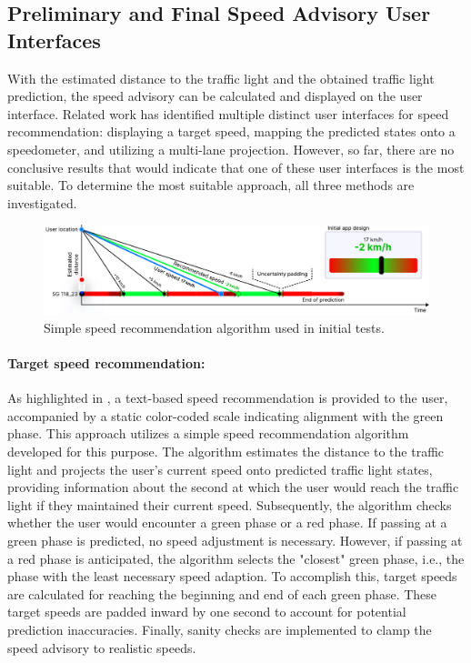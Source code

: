 \subsection{Preliminary and Final Speed Advisory User Interfaces}

With the estimated distance to the traffic light and the obtained traffic light prediction, the speed advisory can be calculated and displayed on the user interface. Related work has identified multiple distinct user interfaces for speed recommendation: displaying a target speed, mapping the predicted states onto a speedometer, and utilizing a multi-lane projection. However, so far, there are no conclusive results that would indicate that one of these user interfaces is the most suitable. To determine the most suitable approach, all three methods are investigated.

\begin{figure}[htbp]
\centering
\includegraphics[width=\linewidth]{images/graph-based-speed-recommendation.pdf}
\caption{Simple speed recommendation algorithm used in initial tests.}
\label{fig:graph-based-speed-recommendation}
\end{figure}

\paragraph{Target speed recommendation:} As highlighted in , a text-based speed recommendation is provided to the user, accompanied by a static color-coded scale indicating alignment with the green phase. This approach utilizes a simple speed recommendation algorithm developed for this purpose. The algorithm estimates the distance to the traffic light and projects the user's current speed onto predicted traffic light states, providing information about the second at which the user would reach the traffic light if they maintained their current speed. Subsequently, the algorithm checks whether the user would encounter a green phase or a red phase. If passing at a green phase is predicted, no speed adjustment is necessary. However, if passing at a red phase is anticipated, the algorithm selects the "closest" green phase, i.e., the phase with the least necessary speed adaption. To accomplish this, target speeds are calculated for reaching the beginning and end of each green phase. These target speeds are padded inward by one second to account for potential prediction inaccuracies. Finally, sanity checks are implemented to clamp the speed advisory to realistic speeds.


